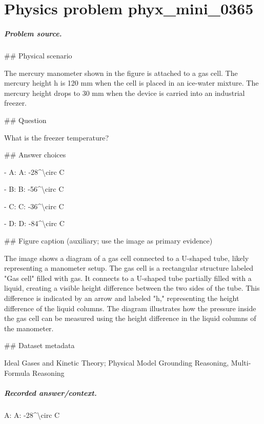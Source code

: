 
\chapter{Physics problem phyx\_mini\_0365}
\label{ch:PhyXMiniProblems_problem_phyx_mini_0365}

\paragraph{Problem source.}
\#\# Physical scenario

The mercury manometer shown in the figure is attached to a gas cell. The mercury height h is 120 mm when the cell is placed in an ice-water mixture. The mercury height drops to 30 mm when the device is carried into an industrial freezer.

\#\# Question

What is the freezer temperature?

\#\# Answer choices

- A: A: -28\textasciicircum{}\textbackslash{}circ C

- B: B: -56\textasciicircum{}\textbackslash{}circ C

- C: C: -36\textasciicircum{}\textbackslash{}circ C

- D: D: -84\textasciicircum{}\textbackslash{}circ C

\#\# Figure caption (auxiliary; use the image as primary evidence)

The image shows a diagram of a gas cell connected to a U-shaped tube, likely representing a manometer setup. The gas cell is a rectangular structure labeled "Gas cell" filled with gas. It connects to a U-shaped tube partially filled with a liquid, creating a visible height difference between the two sides of the tube. This difference is indicated by an arrow and labeled "h," representing the height difference of the liquid columns. The diagram illustrates how the pressure inside the gas cell can be measured using the height difference in the liquid columns of the manometer.

\#\# Dataset metadata

Ideal Gases and Kinetic Theory; Physical Model Grounding Reasoning, Multi-Formula Reasoning

\paragraph{Recorded answer/context.}
A: A: -28\textasciicircum{}\textbackslash{}circ C

